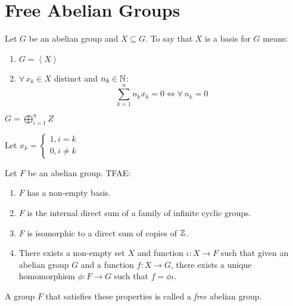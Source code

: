 \documentclass[letterpaper,12pt,fleqn]{article}
\newcommand{\cycle}[1]{\left<#1\right>}
\begin{document}
\section*{Free Abelian Groups}

\begin{definition}
  Let $G$ be an abelian group and $X\subseteq G$. To say that $X$ is a basis
  for $G$ means:
  \begin{enumerate}
  \item $G=\cycle{X}$
  \item $\forall\,x_k\in X$ distinct and $n_k\in\mathbb{N}$:
    \[\sum_{k=1}^nn_kx_k=0\iff\forall\,n_k=0\]
  \end{enumerate}
\end{definition}

\begin{example}
  $G=\bigoplus_{i=1}^nZ$

  Let $x_k=\begin{cases}
  1, i=k \\
  0, i\ne k
  \end{cases}$
\end{example}

\begin{theorem}
  Let $F$ be an abelian group. TFAE:
  \begin{enumerate}
  \item $F$ has a non-empty basis.
  \item $F$ is the internal direct sum of a family of infinite cyclic groups.
  \item $F$ is isomorphic to a direct sum of copies of $\mathbb{Z}$.
  \item There exists a non-empty set $X$ and function $\iota:X\to F$ such that
    given an abelian group $G$ and a function $f:X\to G$, there exists a
    unique homomorphism $\phi:F\to G$ such that $f=\phi\iota$.
  \end{enumerate}

  \begin{figure}[h]
    \setlength{\leftskip}{1in}
  \end{figure}

  A group $F$ that satisfies these properties is called a \emph{free} abelian
  group.
\end{theorem}
\end{document}
